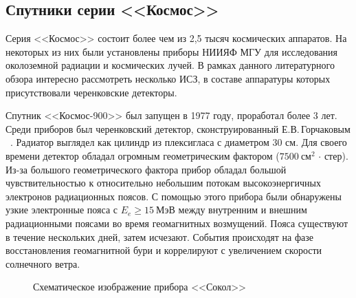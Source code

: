 \documentclass[12pt,a4paper]{report} %
\begin{document}
\subsection{Спутники серии <<Космос>>}
Серия <<Космос>> состоит более чем из 2,5 тысяч космических аппаратов. На некоторых из них были установлены приборы НИИЯФ МГУ для исследования околоземной радиации и космических лучей. 
В рамках данного литературного обзора интересно рассмотреть несколько ИСЗ, в составе аппаратуры которых присутствовали черенковские детекторы. 

Спутник <<Космос-900>> был запущен в 1977 году, проработал более 3 лет. Среди приборов был черенковский детектор, сконструированный Е.В.\,Горчаковым ~\cite{KOSMOS900}.
Радиатор выглядел как цилиндр из плексигласа с диаметром 30 см. 
Для своего времени детектор обладал огромным геометрическим фактором ($7500~см^2\,\cdot\, стер$).
Из-за большого геометрического фактора прибор обладал большой чувствительностью к относительно небольшим потокам высокоэнергичных электронов радиационных поясов.
С помощью этого прибора были обнаружены  узкие электронные пояса с $E_e\geq15~МэВ$ между внутренним и внешним радиационными поясами во время геомагнитных возмущений. Пояса существуют в течение нескольких дней, затем исчезают. События происходят на фазе восстановления геомагнитной бури и коррелируют с увеличением скорости солнечного ветра.
\begin{figure}[th]
	\noindent{}
	\caption{Схематическое изображение прибора <<Сокол>>}
	\label{picSOKOL}
\end{figure}
\end{document}
